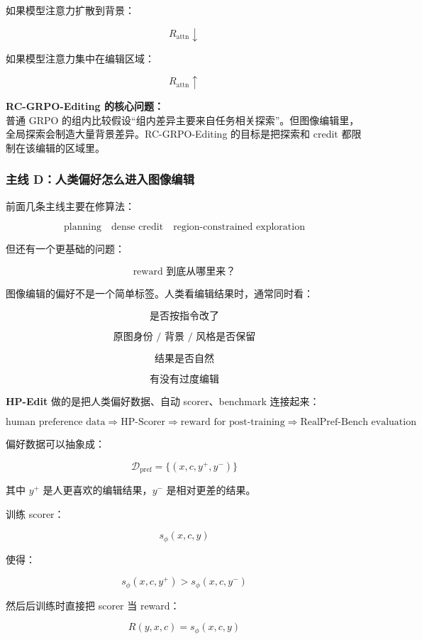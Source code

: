 如果模型注意力扩散到背景：

\[
R_\text{attn}
\downarrow
\]

如果模型注意力集中在编辑区域：

\[
R_\text{attn}
\uparrow
\]

\begin{summarybox}
\textbf{RC-GRPO-Editing 的核心问题：}\\
普通 GRPO 的组内比较假设“组内差异主要来自任务相关探索”。但图像编辑里，全局探索会制造大量背景差异。RC-GRPO-Editing 的目标是把探索和 credit 都限制在该编辑的区域里。
\end{summarybox}

\subsubsection{主线 D：人类偏好怎么进入图像编辑}

前面几条主线主要在修算法：

\[
\text{planning}
\quad
\text{dense credit}
\quad
\text{region-constrained exploration}
\]

但还有一个更基础的问题：

\[
\text{reward 到底从哪里来？}
\]

图像编辑的偏好不是一个简单标签。人类看编辑结果时，通常同时看：

\[
\text{是否按指令改了}
\]

\[
\text{原图身份 / 背景 / 风格是否保留}
\]

\[
\text{结果是否自然}
\]

\[
\text{有没有过度编辑}
\]

\textbf{HP-Edit} 做的是把人类偏好数据、自动 scorer、benchmark 连接起来：

\[
\text{human preference data}
\Rightarrow
\text{HP-Scorer}
\Rightarrow
\text{reward for post-training}
\Rightarrow
\text{RealPref-Bench evaluation}
\]

偏好数据可以抽象成：

\[
\mathcal{D}_\text{pref}
=
\{
(x,c,y^+,y^-)
\}
\]

其中 $y^+$ 是人更喜欢的编辑结果，$y^-$ 是相对更差的结果。

训练 scorer：

\[
s_\phi(x,c,y)
\]

使得：

\[
s_\phi(x,c,y^+)
>
s_\phi(x,c,y^-)
\]

然后后训练时直接把 scorer 当 reward：

\[
R(y,x,c)
=
s_\phi(x,c,y)
\]

